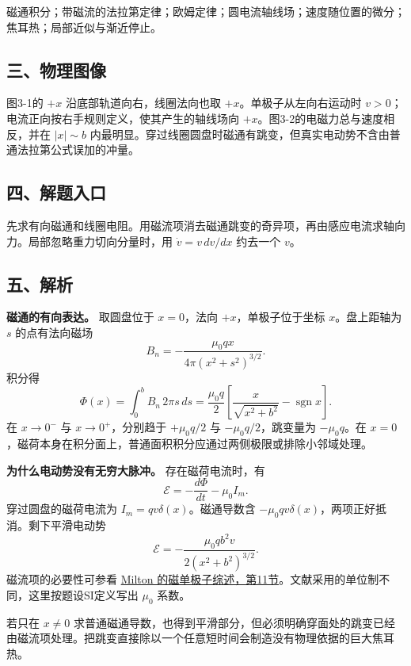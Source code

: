\documentclass[12pt,a4paper,UTF8]{ctexart}
\begin{document}
磁通积分；带磁流的法拉第定律；欧姆定律；圆电流轴线场；速度随位置的微分；焦耳热；局部近似与渐近停止。

\subsection{三、物理图像}\label{ux4e09ux7269ux7406ux56feux50cf-2}

图3-1的 \(+x\) 沿底部轨道向右，线圈法向也取 \(+x\)。单极子从左向右运动时
\(v>0\)；电流正向按右手规则定义，使其产生的轴线场向
\(+x\)。图3-2的电磁力总与速度相反，并在 \(|x|\sim b\)
内最明显。穿过线圈圆盘时磁通有跳变，但真实电动势不含由普通法拉第公式误加的冲量。

\subsection{四、解题入口}\label{ux56dbux89e3ux9898ux5165ux53e3-2}

先求有向磁通和线圈电阻。用磁流项消去磁通跳变的奇异项，再由感应电流求轴向力。局部忽略重力切向分量时，用
\(\dot v=v\,dv/dx\) 约去一个 \(v\)。

\subsection{五、解析}\label{ux4e94ux89e3ux6790-2}

\textbf{磁通的有向表达。} 取圆盘位于 \(x=0\)，法向
\(+x\)，单极子位于坐标 \(x\)。盘上距轴为 \(s\) 的点有法向磁场 \[
B_n=-\frac{\mu_0qx}{4\pi(x^2+s^2)^{3/2}}.
\] 积分得 \[
\Phi(x)=\int_0^bB_n\,2\pi s\,ds
=\boxed{\frac{\mu_0q}{2}
\left[\frac{x}{\sqrt{x^2+b^2}}-\operatorname{sgn}x\right]}.
\] 在 \(x\to0^-\) 与 \(x\to0^+\)，分别趋于 \(+\mu_0q/2\) 与
\(-\mu_0q/2\)，跳变量为 \(-\mu_0q\)。在
\(x=0\)，磁荷本身在积分面上，普通面积积分应通过两侧极限或排除小邻域处理。

\textbf{为什么电动势没有无穷大脉冲。} 存在磁荷电流时，有 \[
\mathcal E=-\frac{d\Phi}{dt}-\mu_0I_m.
\] 穿过圆盘的磁荷电流为 \(I_m=qv\delta(x)\)。磁通导数含
\(-\mu_0qv\delta(x)\)，两项正好抵消。剩下平滑电动势 \[
\boxed{\mathcal E=
-\frac{\mu_0qb^2v}{2(x^2+b^2)^{3/2}}}.
\] 磁流项的必要性可参看
\href{https://www.nevis.columbia.edu/~phypharm/monopole/monopoleReview2006.pdf}{Milton
的磁单极子综述，第11节}。文献采用的单位制不同，这里按题设SI定义写出
\(\mu_0\) 系数。

若只在 \(x\ne0\)
求普通磁通导数，也得到平滑部分，但必须明确穿面处的跳变已经由磁流项处理。把跳变直接除以一个任意短时间会制造没有物理依据的巨大焦耳热。
\end{document}
